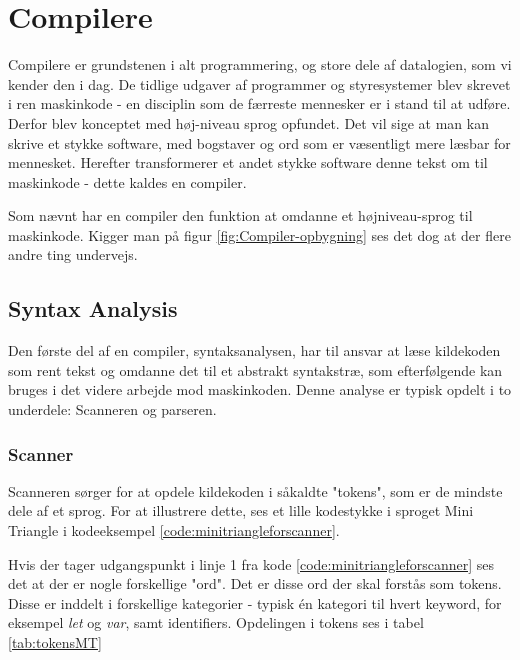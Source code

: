 \section{Compilere}
Compilere er grundstenen i alt programmering, og store dele af datalogien, som vi kender den i dag. De tidlige udgaver af programmer og styresystemer blev skrevet i ren maskinkode - en disciplin som de færreste mennesker er i stand til at udføre. Derfor blev konceptet med høj-niveau sprog opfundet. Det vil sige at man kan skrive et stykke software, med bogstaver og ord som er væsentligt mere læsbar for mennesket. Herefter transformerer et andet stykke software denne tekst om til maskinkode - dette kaldes en compiler.


\noindent Som nævnt har en compiler den funktion at omdanne et højniveau-sprog til maskinkode. Kigger man på figur \ref{fig:Compiler-opbygning} ses det dog at der flere andre ting undervejs.

\subsection{Syntax Analysis}\label{ssec:syntaxanalysis}
Den første del af en compiler, syntaksanalysen, har til ansvar at læse kildekoden som rent tekst og omdanne det til et abstrakt syntakstræ, som efterfølgende kan bruges i det videre arbejde mod maskinkoden. Denne analyse er typisk opdelt i to underdele: Scanneren og parseren. 

\subsubsection{Scanner}
Scanneren sørger for at opdele kildekoden i såkaldte "tokens"\mbox{}, som er de mindste dele af et sprog. For at illustrere dette, ses et lille kodestykke i sproget Mini Triangle i kodeeksempel \ref{code:minitriangleforscanner}.


\noindent Hvis der tager udgangspunkt i linje 1 fra kode \ref{code:minitriangleforscanner} ses det at der er nogle forskellige "ord"\mbox{}. Det er disse ord der skal forstås som tokens. Disse er inddelt i forskellige kategorier - typisk én kategori til hvert keyword, for eksempel \textit{let} og \textit{var}, samt identifiers. Opdelingen i tokens ses i tabel \ref{tab:tokensMT}

